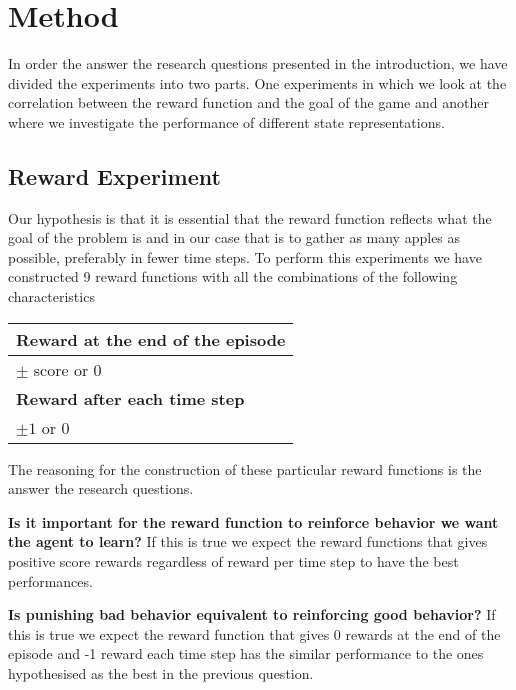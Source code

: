 \documentclass[report.tex]{subfiles}
\begin{document}
    \section*{\centering Method}

    In order the answer the research questions presented in the introduction, we have divided the experiments into two parts. One experiments in which we look at the correlation between the reward function and the goal of the game and another where we investigate the performance of different state representations.

    \subsection*{Reward Experiment}

    Our hypothesis is that it is essential that the reward function reflects what the goal of the problem is and in our case that is to gather as many apples as possible, preferably in fewer time steps. To perform this experiments we have constructed 9 reward functions with all the combinations of the following characteristics

    \begin{center}
        \begin{tabular}{| l |}
            \hline
            \textbf{Reward at the end of the episode} \\ \hline
            $\pm$ score or 0 \\ \hline
            \textbf{Reward after each time step} \\ \hline
            $\pm 1$ or 0 \\ \hline
        \end{tabular}
    \end{center}

    The reasoning for the construction of these particular reward functions is the answer the research questions.

    \textbf{Is it important for the reward function to reinforce behavior we want the agent to learn?} If this is true we expect the reward functions that gives positive score rewards regardless of reward per time step to have the best performances.

    \textbf{Is punishing bad behavior equivalent to reinforcing good behavior?} If this is true we expect the reward function that gives 0 rewards at the end of the episode and -1 reward each time step has the similar performance to the ones hypothesised as the best in the previous question.
\end{document}
